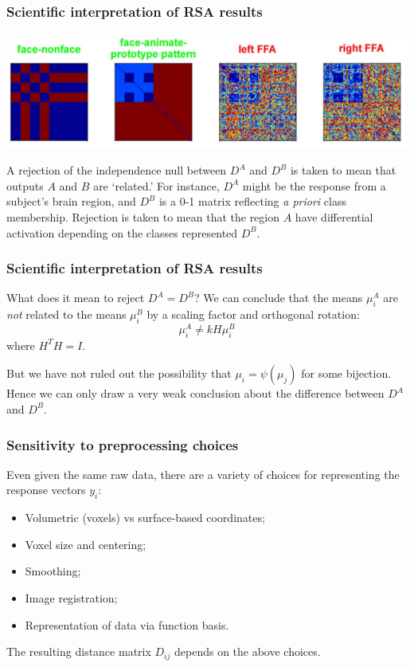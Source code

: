 \documentclass{beamer}
\begin{document}
\begin{frame}
\frametitle{Scientific interpretation of RSA results}
\begin{center}
\includegraphics[scale = 0.3]{k08_classes.png}
\end{center}

A rejection of the independence null between $D^A$ and $D^B$ is taken to mean that outputs $A$ and $B$ are `related.'
For instance, $D^A$ might be the response from a subject's brain region, and $D^B$ is a 0-1 matrix reflecting \emph{a priori} class membership.
Rejection is taken to mean that the region $A$ have differential activation depending on the classes represented $D^B$.
\end{frame}

\begin{frame}
\frametitle{Scientific interpretation of RSA results}

What does it mean to reject $D^A = D^B$?
We can conclude that the means $\mu_i^A$ are \emph{not} related to the means $\mu_i^B$
by a scaling factor and orthogonal rotation:
\[
\mu_i^A \neq k H \mu_i^B
\]
where $H^T H = I$.

But we have not ruled out the possibility that $\mu_i = \psi(\mu_j)$ for some bijection.
Hence we can only draw a very weak conclusion about the difference between $D^A$ and $D^B$.
\end{frame}

\begin{frame}
\frametitle{Sensitivity to preprocessing choices}
Even given the same raw data, there are a variety of choices for representing the response vectors $y_i$:
\begin{itemize}
\item Volumetric (voxels) vs surface-based coordinates;
\item Voxel size and centering;
\item Smoothing;
\item Image registration;
\item Representation of data via function basis.
\end{itemize}

The resulting distance matrix $D_{ij}$ depends on the above choices.
\end{frame}
\end{document}
